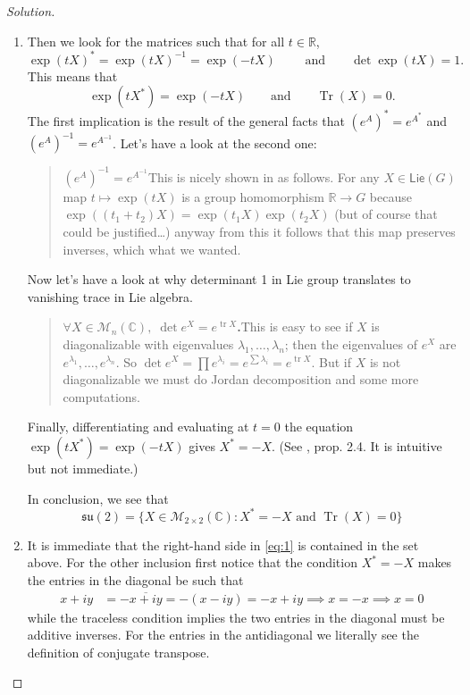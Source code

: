 \begin{proof}[Solution]
\begin{enumerate}[label=\alph*.]
\begin{enumerate}[label=\textbf{Step \arabic*}]
\begin{proof}[Proof of Step 1]
						\end{proof}

					\item Then we look for the matrices such that for all $t\in\mathbb{R}$,
						\[\operatorname{exp}(tX)^* =\operatorname{exp}(tX)^{-1}=\operatorname{exp}(-tX) \qquad \text{ and} \qquad \det \operatorname{exp}(tX)=1. \]
						This means that
						\[\operatorname{exp}(tX^*) =\operatorname{exp}(-tX) \qquad \text{and} \qquad \operatorname{ Tr}(X)=0.\]
						The first implication is the result of the general facts that $(e^{A})^*=e^{A^*}$ and $(e^A)^{-1}=e^{A^{-1}}$. Let's have a look at the second one:
\begin{quotation}
	{\color{3}$(e^A)^{-1}=e^{A^{-1}}$}\hspace{.5em}This is nicely shown in \cite{lee} as follows. For any $X\in\mathsf{Lie}(G)$ map $t\mapsto \operatorname{exp}(tX)$ is a group homomorphism  $\mathbb{R}\to G$ because $\operatorname{exp}((t_1+t_2)X)=\operatorname{exp}(t_1X)\operatorname{exp}(t_2X)$ (but of course that could be justified…) anyway from this it follows that this map preserves inverses, which what we wanted.
\end{quotation}

						Now let's have a look at why determinant 1 in Lie group translates to vanishing trace in Lie algebra.
\begin{quotation}
	{\color{3}\bfseries $\forall X\in\mathcal{M}_{n}(\mathbb{C}), \;\det e^X=e^{\operatorname{tr}X}$.}\hspace{.5em}This is easy to see if $X$ is diagonalizable with eigenvalues  $\lambda_1,\ldots,\lambda_n$; then the eigenvalues of $e^{X}$ are $e^{\lambda_1},\ldots,e^{\lambda_n}$. So $\det e^X=\prod e^{\lambda_i}=e^{\sum \lambda_i}=e^{\operatorname{tr}X}$. But if $X$ is not diagonalizable we must do Jordan decomposition and some more computations.
\end{quotation}

						Finally, differentiating and evaluating at $t=0$ the equation $\operatorname{exp}(tX^*) =\operatorname{exp}(-tX)$ gives $X^*=-X$. (See \cite{hall}, prop. 2.4. It is intuitive but not immediate.)

						In conclusion, we see that
						\[\mathfrak{su}(2)=\{X\in\mathcal{M}_{2\times 2}(\mathbb{C}):X^* =-X\text{ and }\operatorname{Tr}(X)=0 \}\]
		
					\item It is immediate that the right-hand side in \cref{eq:1} is contained in the set above. For the other inclusion first notice that the condition $X^*=-X$ makes the entries in the diagonal be such that
						\begin{align*}							x+iy&=-\overline{x+iy}=-(x-iy)=-x+iy\implies x=-x\implies x=0						\end{align*}
						while the traceless condition implies the two entries in the diagonal must be additive inverses. For the entries in the antidiagonal we literally see the definition of conjugate transpose.
				\end{enumerate}


\end{enumerate}
\end{proof}
